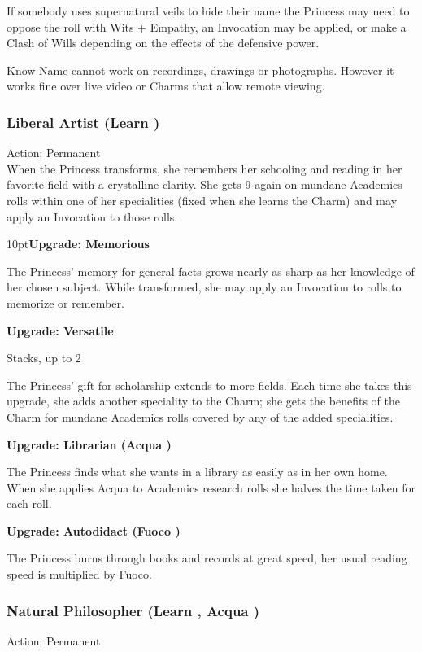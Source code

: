If somebody uses supernatural veils to hide their name the Princess may need to oppose the roll with Wits + Empathy, an Invocation may be applied, or make a Clash of Wills depending on the effects of the defensive power.

Know Name cannot work on recordings, drawings or photographs. However it works fine over live video or Charms that allow remote viewing. 

\subsubsection*{Liberal Artist (Learn \textbullet)}

\noindent Action: Permanent \\

\noindent When the Princess transforms, she remembers her schooling and reading in her favorite field with a crystalline clarity. She gets 9-again on mundane Academics rolls within one of her specialities (fixed when she learns the Charm) and may apply an Invocation to those rolls.

\begin{myindentpar}{10pt}\textbf{Upgrade: Memorious}

The Princess' memory for general facts grows nearly as sharp as her knowledge of her chosen subject. While transformed, she may apply an Invocation to rolls to memorize or remember.

\textbf{Upgrade: Versatile}

Stacks, up to 2

The Princess' gift for scholarship extends to more fields. Each time she takes this upgrade, she adds another speciality to the Charm; she gets the benefits of the Charm for mundane Academics rolls covered by any of the added specialities.

\textbf{Upgrade: Librarian (Acqua \textbullet\textbullet)}

The Princess finds what she wants in a library as easily as in her own home. When she applies Acqua to Academics research rolls she halves the time taken for each roll. 

\textbf{Upgrade: Autodidact (Fuoco \textbullet\textbullet)}

The Princess burns through books and records at great speed, her usual reading speed is multiplied by Fuoco. \end{myindentpar}

\subsubsection{Natural Philosopher (Learn \textbullet, Acqua \textbullet)}
Action: Permanent\\

